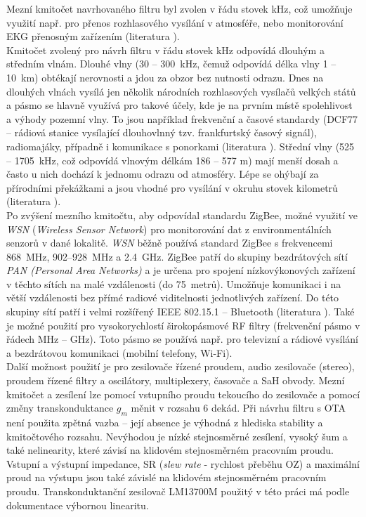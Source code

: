 Mezní kmitočet navrhovaného filtru byl zvolen v řádu stovek kHz, což umožňuje využití např. pro přenos rozhlasového vysílání v atmosféře, nebo monitorování EKG přenosným zařízením (literatura \cite{1}). \\ 
Kmitočet zvolený pro návrh filtru v řádu stovek kHz odpovídá dlouhým a středním vlnám. Dlouhé vlny (30 -- 300~kHz, čemuž odpovídá délka vlny 1 -- 10~km) obtékají nerovnosti a jdou za obzor bez nutnosti odrazu. Dnes na dlouhých vlnách vysílá jen několik národních rozhlasových vysílačů velkých států a pásmo se hlavně využívá pro takové účely, kde je na prvním místě spolehlivost a výhody pozemní vlny. To jsou například frekvenční a časové standardy (DCF77 --  rádiová stanice vysílající dlouhovlnný tzv. frankfurtský časový signál), radiomajáky, případně i komunikace s ponorkami (literatura \cite{2}). Střední vlny (525 -- 1705~kHz, což odpovídá vlnovým délkám 186 -- 577 m) mají menší dosah a často u nich dochází k jednomu odrazu od atmosféry. Lépe se ohýbají za přírodními překážkami a jsou vhodné pro vysílání v okruhu stovek kilometrů (literatura \cite{3}). \\
Po zvýšení mezního kmitočtu, aby odpovídal standardu ZigBee, možné využití ve \textit{WSN} (\textit{Wireless Sensor Network}) pro monitorování dat z environmentálních senzorů v dané lokalitě. 
\textit{WSN} běžně používá standard ZigBee s frekvencemi 868~MHz, 902–928~MHz a 2.4~GHz. ZigBee patří do skupiny bezdrátových sítí \textit{PAN (Personal Area Networks)} a je určena pro spojení nízkovýkonových zařízení v těchto sítích na malé vzdálenosti (do 75~metrů). Umožňuje komunikaci i na větší vzdálenosti bez přímé radiové viditelnosti jednotlivých zařízení. Do této skupiny sítí patří i velmi rozšířený IEEE 802.15.1 – Bluetooth (literatura \cite{4}). Také je možné použití pro vysokorychlostí širokopásmové RF filtry (frekvenční pásmo v řádech MHz -- GHz). Toto pásmo se používá např. pro televizní a rádiové vysílání a bezdrátovou komunikaci (mobilní telefony, Wi-Fi). \\
Další možnost použití je pro zesilovače řízené proudem, audio zesilovače (stereo), proudem řízené filtry a oscilátory, multiplexery, časovače a SaH obvody.
Mezní kmitočet a zesílení lze pomocí vstupního proudu tekoucího do zesilovače a pomocí změny transkonduktance $g_m$ měnit v rozsahu 6 dekád. Při návrhu filtru s OTA není použita zpětná vazba -- její absence je výhodná z hlediska stability a kmitočtového rozsahu. Nevýhodou je nízké stejnosměrné zesílení, vysoký šum a také nelinearity, které závisí na klidovém stejnosměrném pracovním proudu. Vstupní a výstupní impedance, SR (\textit{slew rate} - rychlost přeběhu OZ) a maximální proud na výstupu jsou také závislé na klidovém stejnosměrném pracovním proudu. Transkonduktanční zesilovač LM13700M použitý v této práci má podle dokumentace výbornou linearitu.
